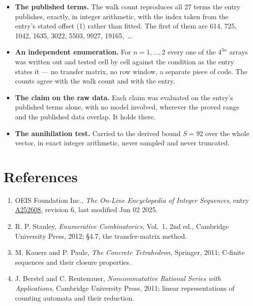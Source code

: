 \documentclass[11pt]{article}
\theoremstyle{definition}
\begin{document}
\begin{itemize}

\item {\bfseries The published terms.} The walk count reproduces all 27 terms the entry publishes, exactly, in integer arithmetic, with the index taken from the entry's stated offset (1) rather than fitted. The first of them are 614, 725, 1042, 1635, 3022, 5503, 9927, 19165,~\dots

\item {\bfseries An independent enumeration.} For $n = 1,\dots,2$ every one of the $4^{3n}$ arrays was written out and tested cell by cell against the condition as the entry states it --- no transfer matrix, no row window, a separate piece of code. The counts agree with the walk count and with the entry.

\item {\bfseries The claim on the raw data.} Each claim was evaluated on the entry's published terms alone, with no model involved, wherever the proved range and the published data overlap. It holds there.

\item {\bfseries The annihilation test.} Carried to the derived bound $S = 92$ over the whole vector, in exact integer arithmetic, never sampled and never truncated.

\end{itemize}

\section{References}

\begin{enumerate}

\item OEIS Foundation Inc., \emph{The On-Line Encyclopedia of Integer Sequences}, entry \href{https://oeis.org/A252608}{A252608}, revision 6, last modified Jun 02 2025.

\item R. P. Stanley, \emph{Enumerative Combinatorics}, Vol.~1, 2nd ed., Cambridge University Press, 2012; \S4.7, the transfer-matrix method.

\item M. Kauers and P. Paule, \emph{The Concrete Tetrahedron}, Springer, 2011; C-finite sequences and their closure properties.

\item J. Berstel and C. Reutenauer, \emph{Noncommutative Rational Series with Applications}, Cambridge University Press, 2011; linear representations of counting automata and their reduction.

\end{enumerate}
\end{document}
